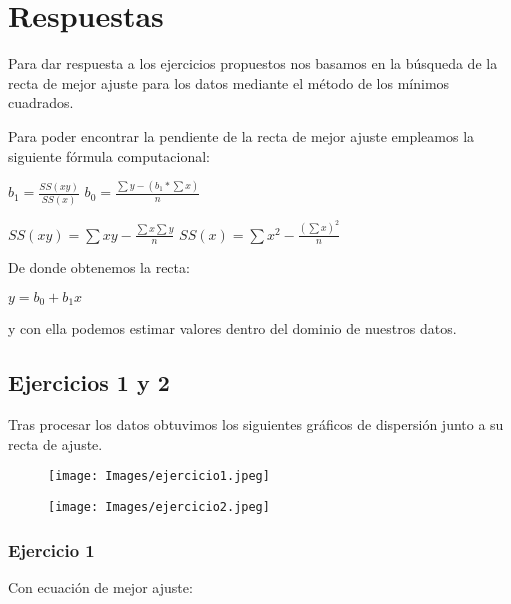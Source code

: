 \documentclass[a4paper,10pt,twocolumn]{article}
\begin{document}
	\section{Respuestas}\label{sub:answers}
		Para dar respuesta a los ejercicios propuestos nos basamos en la búsqueda de la recta de mejor ajuste para los datos mediante el método de los mínimos cuadrados. 
		
		Para poder encontrar la pendiente de la recta de mejor ajuste empleamos la siguiente fórmula computacional:
		
		\begin{center}
			$b_1 = \frac{SS(xy)}{SS(x)}$
			$b_0 = \frac{\sum y - (b_1 * \sum x)}{n}$
		\end{center}
	
		\begin{center}
			$SS(xy) = \sum xy - \frac{\sum x \sum y}{n}$
			$SS(x) = \sum x^2 - \frac{(\sum x)^2}{n}$
		\end{center}
		
		De donde obtenemos la recta:
		
		\begin{center}
			$y = b_0 + b_1x$
		\end{center}
	
		y con ella podemos estimar valores dentro del dominio de nuestros datos.
		
		\subsection{Ejercicios 1 y 2}
			Tras procesar los datos obtuvimos los siguientes gráficos de dispersión junto a su recta de ajuste.
			
			\begin{figure}[h]
				\texttt{[image: Images/ejercicio1.jpeg]}
			\end{figure}
		
			\begin{figure}[htb]
				\texttt{[image: Images/ejercicio2.jpeg]}
			\end{figure}
		
			\subsubsection{Ejercicio 1}
			
			Con ecuación de mejor ajuste:
			
\end{document}
